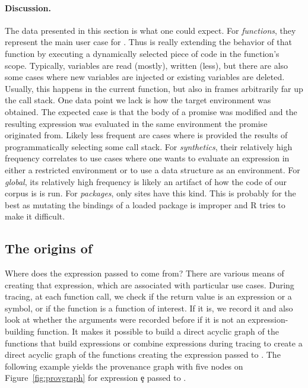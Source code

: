 \documentclass[screen,acmsmall]{acmart}%
\begin{document}
\paragraph{Discussion.}
The data presented in this section is what one could expect. For {\it
  functions}, they represent the main user case for \eval. Thus \eval is really
extending the behavior of that function by executing a dynamically selected
piece of code in the function's scope. Typically, variables are read (mostly),
written (less), but there are also some cases where new variables are injected
or existing variables are deleted. Usually, this happens in the current
function, but also in frames arbitrarily far up the call stack. One data point
we lack is how the target environment was obtained. The expected case is that
the body of a promise was modified and the resulting expression was evaluated in
the same environment the promise originated from. Likely less frequent are cases
where \eval is provided the results of programmatically selecting some call
stack. For {\it synthetics}, their relatively high frequency correlates to use
cases where one wants to evaluate an expression in either a restricted
environment or to use a data structure as an environment. For {\it global}, its
relatively high frequency is likely an artifact of how the code of our corpus is
is run. For {\it packages}, only \packageNbPackageNamespaceEnvSites sites have
this kind. This is probably for the best as mutating the bindings of
a loaded package is improper and R tries to make it difficult.

\subsection{The origins of \eval}

Where does the expression passed to \eval come from? There are various means of
creating that expression, which are associated with particular use cases. During tracing, at each function call, we check if the return value is an expression or a symbol, or if the function is a function of interest. If it is, we record it and also look at whether the arguments were recorded before if it is not an expression-building function. It makes it possible to build a direct acyclic graph of the functions that build expressions or combine expressions during tracing to create a direct acyclic graph of the functions creating the expression passed to \eval. The following example yields the provenance graph with five nodes on Figure~\ref{fig:provgraph} for expression \c{e} passed to \eval.
\end{document}
